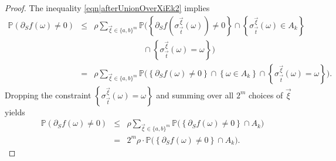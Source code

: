 \documentclass[reqno]{amsart}
\begin{document}
\begin{proof}
The inequality \eqref{eqn|afterUnionOverXiEk2} implies 
\begin{eqnarray}
\mathbb P\left(\partial_Sf(\omega)\neq 0\right)&\leq& \rho \sum_{\overrightarrow\xi\in\{a,b\}^m}
\mathbb P\Big(\left\{\partial_Sf\left(\sigma_{\overrightarrow t}^{\overrightarrow\xi}(\omega)\right)\neq 0\right\} \cap \left\{
\sigma^{\overrightarrow \xi}_{\overrightarrow t}(\omega)\in A_k\right\}
\nonumber \\ &&\quad\quad\quad\quad\quad\quad \cap
\left\{\sigma_{\overrightarrow t}^{\overrightarrow\xi}(\omega)=\omega\right\}\Big) \nonumber \\
&=&
 \rho \sum_{\overrightarrow\xi\in\{a,b\}^m}
\mathbb P\Big(\left\{\partial_Sf(\omega)\neq 0\right\} \cap \left\{
\omega\in A_k\right\} \cap
\left\{\sigma_{\overrightarrow t}^{\overrightarrow\xi}(\omega)=\omega\right\}\Big).
\nonumber
\end{eqnarray}
Dropping the constraint $\left\{\sigma_{\overrightarrow t}^{\overrightarrow\xi}(\omega)=\omega\right\}$ and summing over all $2^m$ choices of $\overrightarrow\xi$ yields
\begin{eqnarray}
\mathbb P\left(\partial_Sf(\omega)\neq 0\right)&\leq& 
 \rho \sum_{\overrightarrow\xi\in\{a,b\}^m}
\mathbb P\Big(\left\{\partial_Sf(\omega)\neq 0\right\} \cap A_k\Big)\nonumber 
\\
& =&
 2^m\rho \cdot \mathbb P\Big(\left\{\partial_Sf(\omega)\neq 0\right\} \cap A_k\Big).
 \label{eqn|afterUnionOverXiEkAfterIndependence}
\end{eqnarray}


\end{proof}
\end{document}
